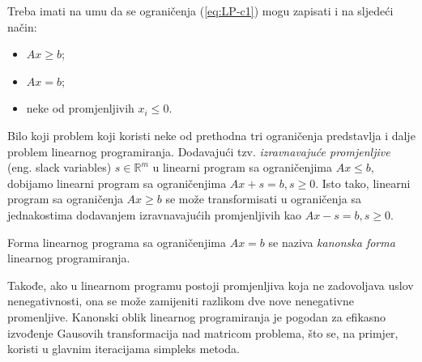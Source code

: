 \documentclass[a4paper, utf8, 11pt, colorlinks]{book}
\theoremstyle{definition}
\begin{document}
Treba imati na umu da se ograničenja (\ref{eq:LP-c1}) mogu zapisati i na sljedeći način:
\begin{itemize}
    \item $Ax \geq b$;
    \item $Ax = b$;
    \item neke od promjenljivih $x_i\leqslant 0$.
\end{itemize}
Bilo koji problem koji koristi neke od prethodna tri ograničenja predstavlja i dalje problem linearnog programiranja. Dodavajući tzv. \emph{izravnavajuće promjenljive} (eng. slack variables) $s \in \mathbb{R}^m$ u linearni program sa ograničenjima $Ax \leq b$, dobijamo linearni program sa ograničenjima $Ax + s = b, s \geq 0$. Isto tako, linearni program sa ograničenja $Ax \geq b$ se može transformisati u ograničenja sa jednakostima dodavanjem izravnavajućih promjenljivih kao $Ax - s = b, s\geq 0$.

 Forma linearnog programa sa ograničenjima $Ax = b$ se naziva \emph{kanonska forma} linearnog programiranja. 
 
 Takođe, ako u linearnom
programu postoji promjenljiva koja ne zadovoljava uslov nenegativnosti, ona se može zamijeniti razlikom dve nove nenegativne promenljive. Kanonski oblik linearnog programiranja je pogodan za efikasno izvođenje Gausovih transformacija  nad matricom problema, što se, na primjer, koristi u glavnim iteracijama simpleks metoda.   %
\end{document}
